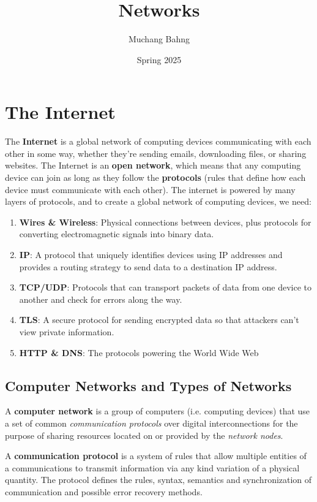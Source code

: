 \documentclass{article}
\newcounter{definition}[section]
\begin{document}
\title{Networks}
\author{Muchang Bahng}
\date{Spring 2025}

\maketitle
\tableofcontents
\pagebreak

\section{The Internet}

  The \textbf{Internet} is a global network of computing devices communicating with each other in some way, whether they're sending emails, downloading files, or sharing websites. The Internet is an \textbf{open network}, which means that any computing device can join as long as they follow the \textbf{protocols} (rules that define how each device must communicate with each other). The internet is powered by many layers of protocols, and to create a global network of computing devices, we need: 
  \begin{enumerate}
      \item \textbf{Wires \& Wireless}: Physical connections between devices, plus protocols for converting electromagnetic signals into binary data. 
      \item \textbf{IP}: A protocol that uniquely identifies devices using IP addresses and provides a routing strategy to send data to a destination IP address. 
      \item \textbf{TCP/UDP}: Protocols that can transport packets of data from one device to another and check for errors along the way. 
      \item \textbf{TLS}: A secure protocol for sending encrypted data so that attackers can't view private information. 
      \item \textbf{HTTP \& DNS}: The protocols powering the World Wide Web
  \end{enumerate}

  \subsection{Computer Networks and Types of Networks}

  \begin{definition}
    \label{def:computer-network}
  A \textbf{computer network} is a group of computers (i.e. computing devices) that use a set of common \textit{communication protocols} over digital interconnections for the purpose of sharing resources located on or provided by the \textit{network nodes}. 

  A \textbf{communication protocol} is a system of rules that allow multiple entities of a communications to transmit information via any kind variation of a physical quantity. The protocol defines the rules, syntax, semantics and synchronization of communication and possible error recovery methods. 
  \end{definition}
\end{document}
